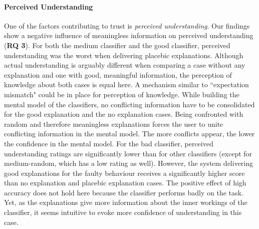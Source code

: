 \paragraph{Perceived Understanding} 
One of the factors contributing to trust is \textit{perceived understanding}. Our findings show a negative influence of meaningless information on perceived understanding (\textbf{RQ 3}). For both the medium classifier and the good classifier, perceived understanding was the worst when delivering placebic explanations. Although actual understanding is arguably different when comparing a case without any explanation and one with good, meaningful information, the perception of knowledge about both cases is equal here. A mechanism similar to ``expectation mismatch" could be in place for perception of knowledge. While building the mental model of the classifiers, no conflicting information have to be consolidated for the good explanation and the no explanation cases. Being confronted with random and therefore meaningless explanations forces the user to unite conflicting information in the mental model. The more conflicts appear, the lower the confidence in the mental model.\newline
For the bad classifier, perceived understanding ratings are significantly lower than for other classifiers (except for medium-random, which has a low rating as well). However, the system delivering good explanations for the faulty behaviour receives a significantly higher score than no explanation and placebic explanation cases. The positive effect of high accuracy does not hold here because the classifier performs badly on the task. Yet, as the explanations give more information about the inner workings of the classifier, it seems intuitive to evoke more confidence of understanding in this case.\newline
